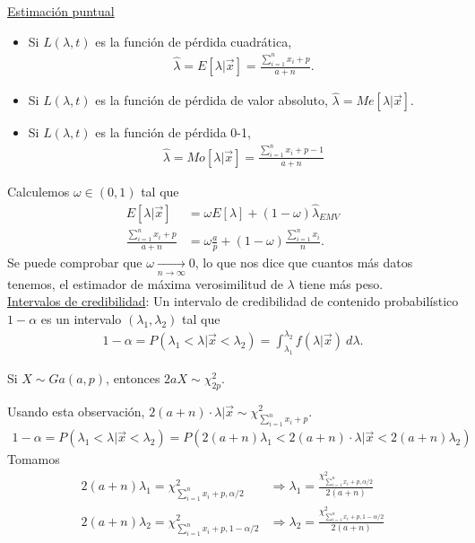 \noindent \underline{Estimación puntual}
\begin{itemize}
    \item Si $L(\lambda,t)$ es la función de pérdida cuadrática, 
    \begin{align*}
        \widehat{\lambda} = E[\lambda |  \vec{x}] = \frac{\sum_{i=1}^{n} x_i + p}{a+n}.
    \end{align*}
    \item Si $L(\lambda,t)$ es la función de pérdida de valor absoluto, $\widehat{\lambda} = Me[\lambda | \vec{x}]$.
    \item Si $L(\lambda,t)$ es la función de pérdida 0-1, 
    \begin{align*}
        \widehat{\lambda} = Mo[\lambda | \vec{x}] =  \frac{\sum_{i=1}^{n} x_i + p-1}{a+n} 
    \end{align*}
\end{itemize}
Calculemos $\omega \in (0,1)$ tal que 
\begin{align*}
    E[\lambda  | \vec{x}] &= \omega E[\lambda]  + (1 - \omega) \widehat{\lambda }_{EMV}  \\
    \frac{\sum_{i=1}^{n} x_i + p}{a+n} &= \omega \frac{a}{p} + (1-\omega) \frac{\sum_{i=1}^{n} x_i}{n}.
\end{align*}
Se puede comprobar que $\omega \xrightarrow[n \to \infty]{} 0$, lo que nos dice que cuantos más datos tenemos, el estimador de máxima verosimilitud de $\lambda$ tiene más peso.
\\
\newline
\noindent \underline{Intervalos de credibilidad}: Un intervalo de credibilidad de contenido probabilístico $1-\alpha$ es un intervalo $(\lambda_1,\lambda_2)$ tal que
\begin{align*}
    1 - \alpha = P(\lambda_1 < \lambda | \vec{x} < \lambda_2) = \int_{\lambda_1}^{\lambda_2} f(\lambda | \vec{x}) \ d\lambda.
\end{align*}
\begin{obs}
    Si $X \sim Ga(a,p)$, entonces $2aX \sim \chi^2_{2p}$.
\end{obs}
\noindent Usando esta observación, $2(a+n) \cdot \lambda | \vec{x} \sim \chi^2_{\sum_{i=1}^{n} x_i + p }$. 
\begin{align*}
    1 - \alpha = P(\lambda_1 < \lambda | \vec{x} < \lambda_2) = P(2(a+n)\lambda_1 < 2(a+n) \cdot\lambda | \vec{x} < 2(a+n) \lambda_2)
\end{align*}
Tomamos 
\begin{align*}
    2(a+n)\lambda_1 = \chi^2_{\sum_{i=1}^{n} x_i + p, \alpha/2 } &\Longrightarrow \lambda_1 = \frac{\chi^2_{\sum_{i=1}^{n} x_i + p, \alpha/2 }}{2(a+n)} \\
    2(a+n)\lambda_2 = \chi^2_{\sum_{i=1}^{n} x_i + p, 1- \alpha/2 } &\Longrightarrow \lambda_2 = \frac{\chi^2_{\sum_{i=1}^{n} x_i + p, 1- \alpha/2 }}{2(a+n)}
\end{align*}
